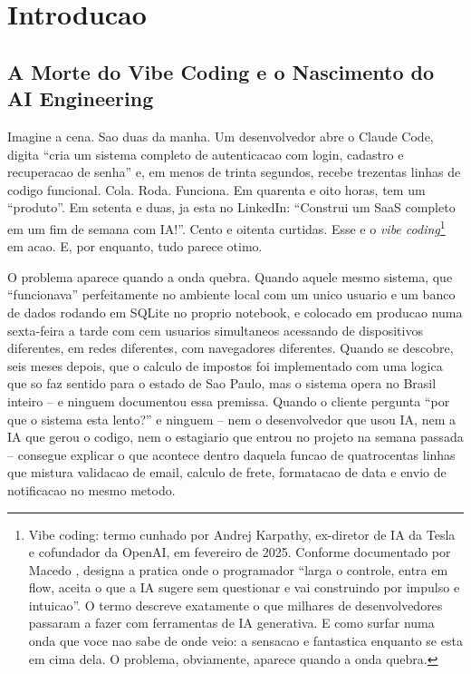 \documentclass[12pt,a4paper,oneside,sumario=tradicional,chapter=TITLE,section=TITLE,subsection=TITLE,english,brazil]{abntex2}
\begin{document}
\tableofcontents*\cleardoublepage

\chapter{Introducao}

\section{A Morte do Vibe Coding e o Nascimento do AI Engineering}

Imagine a cena. Sao duas da manha. Um desenvolvedor abre o Claude Code, digita ``cria um sistema completo de autenticacao com login, cadastro e recuperacao de senha'' e, em menos de trinta segundos, recebe trezentas linhas de codigo funcional. Cola. Roda. Funciona. Em quarenta e oito horas, tem um ``produto''. Em setenta e duas, ja esta no LinkedIn: ``Construi um SaaS completo em um fim de semana com IA!''. Cento e oitenta curtidas. Esse e o \textit{vibe coding}\footnote{Vibe coding: termo cunhado por Andrej Karpathy\cite{macedo2026engenharia}, ex-diretor de IA da Tesla e cofundador da OpenAI, em fevereiro de 2025. Conforme documentado por Macedo \cite[p. 23]{macedo2026engenharia}, designa a pratica onde o programador ``larga o controle, entra em flow, aceita o que a IA sugere sem questionar e vai construindo por impulso e intuicao''. O termo descreve exatamente o que milhares de desenvolvedores passaram a fazer com ferramentas de IA generativa. E como surfar numa onda que voce nao sabe de onde veio: a sensacao e fantastica enquanto se esta em cima dela. O problema, obviamente, aparece quando a onda quebra.} em acao. E, por enquanto, tudo parece otimo.

O problema aparece quando a onda quebra. Quando aquele mesmo sistema, que ``funcionava'' perfeitamente no ambiente local com um unico usuario e um banco de dados rodando em SQLite no proprio notebook, e colocado em producao numa sexta-feira a tarde com cem usuarios simultaneos acessando de dispositivos diferentes, em redes diferentes, com navegadores diferentes. Quando se descobre, seis meses depois, que o calculo de impostos foi implementado com uma logica que so faz sentido para o estado de Sao Paulo, mas o sistema opera no Brasil inteiro -- e ninguem documentou essa premissa. Quando o cliente pergunta ``por que o sistema esta lento?'' e ninguem -- nem o desenvolvedor que usou IA, nem a IA que gerou o codigo, nem o estagiario que entrou no projeto na semana passada -- consegue explicar o que acontece dentro daquela funcao de quatrocentas linhas que mistura validacao de email, calculo de frete, formatacao de data e envio de notificacao no mesmo metodo.
\end{document}
